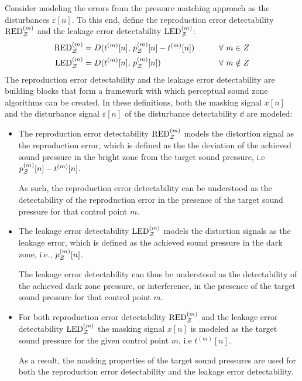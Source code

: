 Consider modeling the errors from the pressure matching approach as the disturbances $\varepsilon[n]$.
To this end, define the reproduction error detectability $\text{RED}^{(m)}_{\mathcal{Z}}$ 
and the leakage error detectability $\text{LED}^{(m)}_{\mathcal{Z}}$:
\begin{alignat}{2}
    \text{RED}^{(m)}_{\mathcal{Z}} &= D(t^{(m)}[n],\,p_{\mathcal{Z}}^{(m)}[n] - t^{(m)}[n]) \qquad&& \forall\,\, m\in Z 
        \label{eq:sound_zone:approach_selection:RED}\\
    \text{LED}^{(m)}_{\mathcal{Z}} &= D(t^{(m)}[n],\,p_{\mathcal{Z}}^{(m)}[n]) \qquad&& \forall\,\, m\notin Z 
        \label{eq:sound_zone:approach_selection:LED} 
\end{alignat}
The reproduction error detectability and the leakage error detectability are building blocks that form a framework
with which perceptual sound zone algorithms can be created.
In these definitions, both the masking signal $x[n]$ and the disturbance signal $\varepsilon[n]$ of the 
disturbance detectability $\dd$ are modeled:  

\begin{itemize}
    \item 
        The reproduction error detectability $\text{RED}^{(m)}_{\mathcal{Z}}$ models the distortion signal 
        as the reproduction error, which is defined as the 
        the deviation of the achieved sound pressure in the bright zone from the target sound pressure, i.e 
        $p_{\mathcal{Z}}^{(m)}[n] - t^{(m)}[n]$. 

        As such, the reproduction error detectability can be understood as the detectability of the reproduction error in the presence of the target sound pressure for that control point $m$.
    \item 
        The leakage error detectability $\text{LED}^{(m)}_{\mathcal{Z}}$ models the distortion signals
        as the leakage error, which is defined as the achieved sound pressure in the dark zone, i.e., $p_{\mathcal{Z}}^{(m)}[n]$.  

        The leakage error detectability can thus be understood as the detectability of the achieved dark zone pressure, or interference, in the presence of the target sound pressure for that control point $m$.
    \item 
        For both reproduction error detectability $\text{RED}^{(m)}_{\mathcal{Z}}$ 
        and the leakage error detectability $\text{LED}^{(m)}_{\mathcal{Z}}$ the masking signal $x[n]$ is modeled as the target 
        sound pressure for the given control point $m$, i.e $t^{(m)}[n]$. 

        As a result, the masking properties of the target sound pressures are used for both the reproduction error detectability and the leakage error detectability.
\end{itemize}

